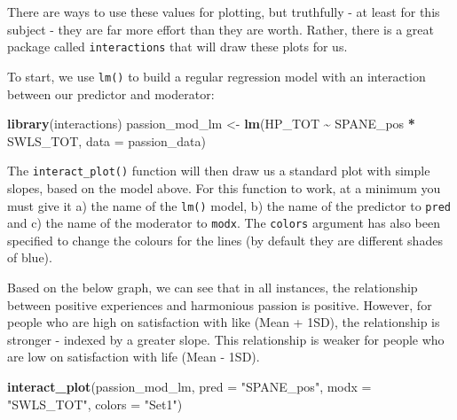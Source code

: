 \documentclass[
]{book}
\newenvironment{Shaded}{\begin{snugshade}}{\end{snugshade}}
\newcommand{\AttributeTok}[1]{\textcolor[rgb]{0.13,0.29,0.53}{#1}}
\newcommand{\FunctionTok}[1]{\textcolor[rgb]{0.13,0.29,0.53}{\textbf{#1}}}
\newcommand{\NormalTok}[1]{#1}
\newcommand{\OtherTok}[1]{\textcolor[rgb]{0.56,0.35,0.01}{#1}}
\newcommand{\SpecialCharTok}[1]{\textcolor[rgb]{0.81,0.36,0.00}{\textbf{#1}}}
\newcommand{\StringTok}[1]{\textcolor[rgb]{0.31,0.60,0.02}{#1}}
\begin{document}
There are ways to use these values for plotting, but truthfully - at least for this subject - they are far more effort than they are worth. Rather, there is a great package called \texttt{interactions} that will draw these plots for us.

To start, we use \texttt{lm()} to build a regular regression model with an interaction between our predictor and moderator:

\begin{Shaded}
\begin{Highlighting}[]
\FunctionTok{library}\NormalTok{(interactions)}
\NormalTok{passion\_mod\_lm }\OtherTok{\textless{}{-}} \FunctionTok{lm}\NormalTok{(HP\_TOT }\SpecialCharTok{\textasciitilde{}}\NormalTok{ SPANE\_pos }\SpecialCharTok{*}\NormalTok{ SWLS\_TOT, }\AttributeTok{data =}\NormalTok{ passion\_data)}
\end{Highlighting}
\end{Shaded}

The \texttt{interact\_plot()} function will then draw us a standard plot with simple slopes, based on the model above. For this function to work, at a minimum you must give it a) the name of the \texttt{lm()} model, b) the name of the predictor to \texttt{pred} and c) the name of the moderator to \texttt{modx}. The \texttt{colors} argument has also been specified to change the colours for the lines (by default they are different shades of blue).

Based on the below graph, we can see that in all instances, the relationship between positive experiences and harmonious passion is positive. However, for people who are high on satisfaction with like (Mean + 1SD), the relationship is stronger - indexed by a greater slope. This relationship is weaker for people who are low on satisfaction with life (Mean - 1SD).

\begin{Shaded}
\begin{Highlighting}[]
\FunctionTok{interact\_plot}\NormalTok{(passion\_mod\_lm, }
              \AttributeTok{pred =} \StringTok{"SPANE\_pos"}\NormalTok{,}
              \AttributeTok{modx =} \StringTok{"SWLS\_TOT"}\NormalTok{, }
              \AttributeTok{colors =} \StringTok{"Set1"}\NormalTok{) }
\end{Highlighting}
\end{Shaded}
\end{document}
